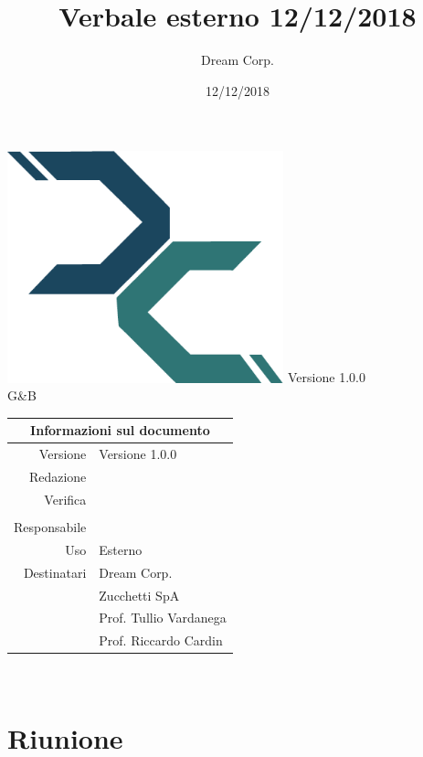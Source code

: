 \documentclass{article}
\title{\fontsize{40}{40}\selectfont Verbale esterno 12/12/2018}
\author{Dream Corp.}
\date{12/12/2018}
\newcommand{\red}{\daL}
\newcommand{\verp}{\mic}
\newcommand{\res}{\gia}
\newcommand{\version}{Versione 1.0.0}
\newcommand{\use}{Esterno}
\begin{document}
  
    \maketitle
	\begin{center}
	\includegraphics[width = 80mm]{../../logo.png}\newline
	\huge \version 
	\\G\&B
	
	\begin{table}[h!]
		\centering
		\begin{tabular}{r|l}
			\multicolumn{2}{c}{Informazioni sul documento}\\
			\hline
			Versione & \version \\
			Redazione & \red \\
			Verifica & \verp\\
			& \vers\\
			Responsabile & \res\\
			Uso & \use\\
			Destinatari & Dream Corp. \\
			& Zucchetti SpA\\
			& Prof. Tullio Vardanega\\
			& Prof. Riccardo Cardin\\
		\end{tabular}
	\end{table}
	
	\end{center}
  
  
  \newpage
\newline
~\newline
\section{Riunione}
\end{document}
